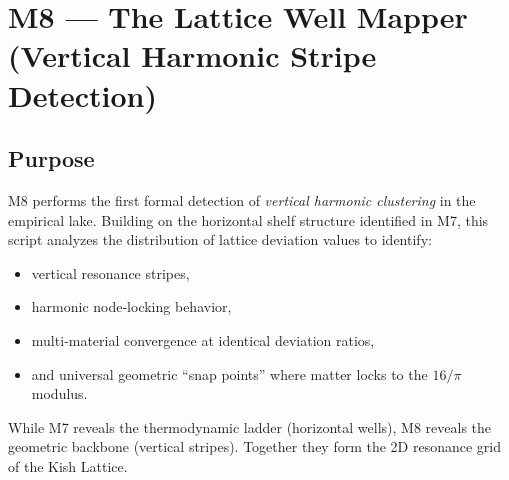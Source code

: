 \documentclass[11pt, letterpaper, openany]{book}
\begin{document}
\section{M8 — The Lattice Well Mapper (Vertical Harmonic Stripe Detection)}

\subsection*{Purpose}
M8 performs the first formal detection of \emph{vertical harmonic clustering} in
the empirical lake. Building on the horizontal shelf structure identified in M7,
this script analyzes the distribution of lattice deviation values to identify:

\begin{itemize}
    \item vertical resonance stripes,
    \item harmonic node‑locking behavior,
    \item multi‑material convergence at identical deviation ratios,
    \item and universal geometric ``snap points'' where matter locks to the
          $16/\pi$ modulus.
\end{itemize}

While M7 reveals the thermodynamic ladder (horizontal wells), M8 reveals the
geometric backbone (vertical stripes). Together they form the 2D resonance grid
of the Kish Lattice.
\end{document}
